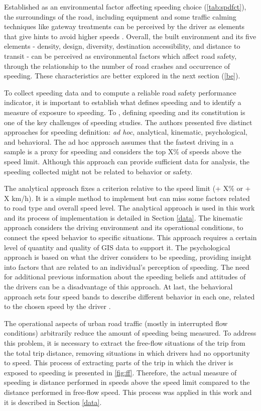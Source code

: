 Established as an environmental factor affecting speeding choice (\autoref{tab:spdfct}), the surroundings of the road, including equipment and some traffic calming techniques like gateway treatments can be perceived by the driver as elements that give hints to avoid higher speeds \cite{WHO2008}. Overall, the built environment and its five elements - density, design, diversity, destination accessibility, and distance to transit - can be perceived as environmental factors which affect road safety, through the relationship to the number of road crashes and occurrence of speeding. These characteristics are better explored in the next section (\ref{be}). 

To collect speeding data and to compute a reliable road safety performance indicator, it is important to establish what defines speeding and to identify a measure of exposure to speeding. To \textcite{Richard2013}, defining speeding and its constitution is one of the key challenges of speeding studies. The authors presented five distinct approaches for speeding definition: \textit{ad hoc}, analytical, kinematic, psychological, and behavioral. The ad hoc approach assumes that the fastest driving in a sample is a proxy for speeding and considers the top X\% of speeds above the speed limit. Although this approach can provide sufficient data for analysis, the speeding collected might not be related to behavior or safety. 

The analytical approach fixes a criterion relative to the speed limit (+ X\% or + X km/h). It is a simple method to implement but can miss some factors related to road type and overall speed level. The analytical approach is used in this work and its process of implementation is detailed in Section \ref{data}. The kinematic approach considers the driving environment and its operational conditions, to connect the speed behavior to specific situations. This approach requires a certain level of quantity and quality of GIS data to support it. The psychological approach is based on what the driver considers to be speeding, providing insight into factors that are related to an individual's perception of speeding. The need for additional previous information about the speeding beliefs and attitudes of the drivers can be a disadvantage of this approach. At last, the behavioral approach sets four speed bands to describe different behavior in each one, related to the chosen speed by the driver \cite{Richard2013}.

The operational aspects of urban road traffic (mostly in interrupted flow conditions) arbitrarily reduce the amount of speeding being measured. To address this problem, it is necessary to extract the free-flow situations of the trip from the total trip distance, removing situations in which drivers had no opportunity to speed. This process of extracting parts of the trip in which the driver is exposed to speeding is presented in \autoref{fig:ff}. Therefore, the actual measure of speeding is distance performed in speeds above the speed limit compared to the distance performed in free-flow speed. This process was applied in this work and it is described in Section \ref{data}. 

